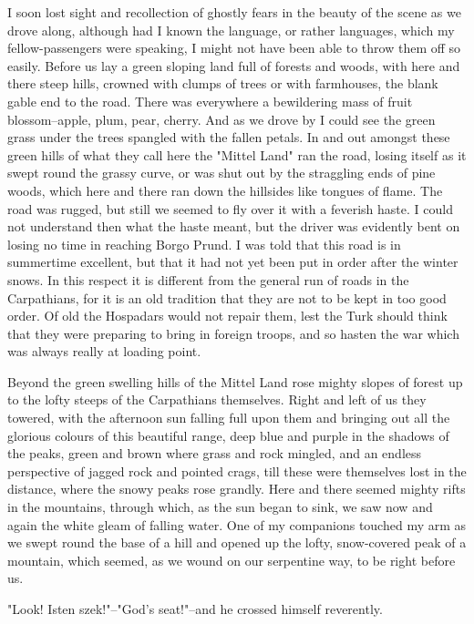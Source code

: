 I soon lost sight and recollection of ghostly fears in the beauty of the scene as we drove along, although had I known the language, or rather languages, which my fellow-passengers were speaking, I might not have been able to throw them off so easily. Before us lay a green sloping land full of forests and woods, with here and there steep hills, crowned with clumps of trees or with farmhouses, the blank gable end to the road. There was everywhere a bewildering mass of fruit blossom--apple, plum, pear, cherry. And as we drove by I could see the green grass under the trees spangled with the fallen petals. In and out amongst these green hills of what they call here the "Mittel Land" ran the road, losing itself as it swept round the grassy curve, or was shut out by the straggling ends of pine woods, which here and there ran down the hillsides like tongues of flame. The road was rugged, but still we seemed to fly over it with a feverish haste. I could not understand then what the haste meant, but the driver was evidently bent on losing no time in reaching Borgo Prund. I was told that this road is in summertime excellent, but that it had not yet been put in order after the winter snows. In this respect it is different from the general run of roads in the Carpathians, for it is an old tradition that they are not to be kept in too good order. Of old the Hospadars would not repair them, lest the Turk should think that they were preparing to bring in foreign troops, and so hasten the war which was always really at loading point. 

Beyond the green swelling hills of the Mittel Land rose mighty slopes of forest up to the lofty steeps of the Carpathians themselves. Right and left of us they towered, with the afternoon sun falling full upon them and bringing out all the glorious colours of this beautiful range, deep blue and purple in the shadows of the peaks, green and brown where grass and rock mingled, and an endless perspective of jagged rock and pointed crags, till these were themselves lost in the distance, where the snowy peaks rose grandly. Here and there seemed mighty rifts in the mountains, through which, as the sun began to sink, we saw now and again the white gleam of falling water. One of my companions touched my arm as we swept round the base of a hill and opened up the lofty, snow-covered peak of a mountain, which seemed, as we wound on our serpentine way, to be right before us. 

"Look! Isten szek!"--"God's seat!"--and he crossed himself reverently. 

